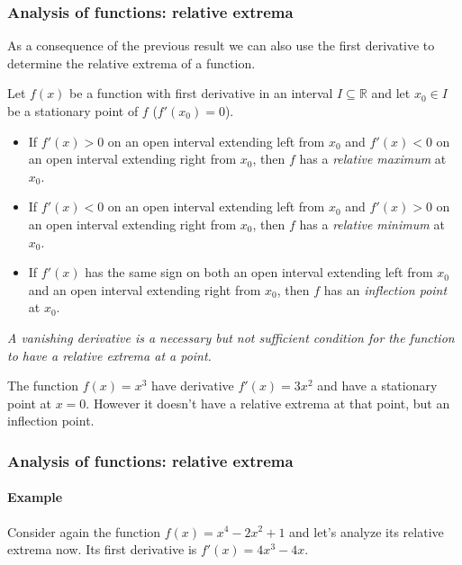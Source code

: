 \begin{frame}
\frametitle{Analysis of functions: relative extrema}
As a consequence of the previous result we can also use the first derivative to determine the relative extrema of a function. 
\begin{theorem}
Let $f(x)$ be a function with first derivative in an interval $I\subseteq \mathbb{R}$ and let $x_0\in I$ be a stationary point of $f$ ($f'(x_0)=0$).
\begin{itemize}
\item  If $f'(x)>0$ on an open interval extending left from $x_0$ and $f'(x)<0$ on an open interval extending right from $x_0$, then $f$ has a \emph{relative maximum} at $x_0$.
\item  If $f'(x)<0$ on an open interval extending left from $x_0$ and $f'(x)>0$ on an open interval extending right from $x_0$, then $f$ has a \emph{relative minimum} at $x_0$.
\item If $f'(x)$ has the same sign on both an open interval extending left from $x_0$ and an open interval extending right from $x_0$, then $f$ has an \emph{inflection point} at $x_0$.
\end{itemize}
\end{theorem}

 \emph{A vanishing derivative is a necessary but not sufficient condition for the function to have a relative extrema at a point.}

 The function $f(x)=x^3$ have derivative $f'(x)=3x^2$ and have a stationary point at $x=0$.
However it doesn't have a relative extrema at that point, but an inflection point.
\end{frame}


\begin{frame}
\frametitle{Analysis of functions: relative extrema}
\framesubtitle{Example}
Consider again the function $f(x)=x^4-2x^2+1$ and let's analyze its relative extrema now. 
Its first derivative is $f'(x)=4x^3-4x$.
\begin{center}
\scalebox{0.9}{}
\end{center}
\end{frame}


